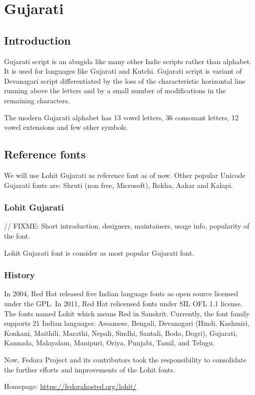 \chapter{Gujarati}
\section{Introduction}

Gujarati script is an abugida like many other Indic scripts rather than
alphabet. It is used for languages like Gujarati and Kutchi. Gujarati script is
variant of Devanagari script differentiated by the loss of the characteristic
horizontal line running above the letters and by a small number of
modifications in the remaining characters.

The modern Gujarati alphabet has 13 vowel letters, 36 consonant letters, 12
vowel extensions and few other symbols.

\section{Reference fonts}

We will use Lohit Gujarati as reference font as of now. Other popular Unicode
Gujarati fonts are: Shruti (non free, Microsoft), Rekha, Aakar and Kalapi.

\subsection{Lohit Gujarati}
// FIXME: Short introduction, designers, maintainers, usage info, popularity of
the font.

Lohit Gujarati font is consider as most popular Gujarati font.

\subsection{History}
In 2004, Red Hat released five Indian language fonts as open source licensed
under the GPL. In 2011, Red Hat relicensed fonts under SIL OFL 1.1 license.
The fonts named Lohit which means Red in Sanskrit. Currently, the font family
supports 21 Indian languages: Assamese, Bengali, Devanagari (Hindi, Kashmiri,
Konkani, Maithili, Marathi, Nepali, Sindhi, Santali, Bodo, Dogri), Gujarati,
Kannada, Malayalam, Manipuri, Oriya, Punjabi, Tamil, and Telugu.

Now, Fedora Project and its contributors took the responsibility to consolidate
the further efforts and improvements of the Lohit fonts.

Homepage: {\url{https://fedorahosted.org/lohit/}}

